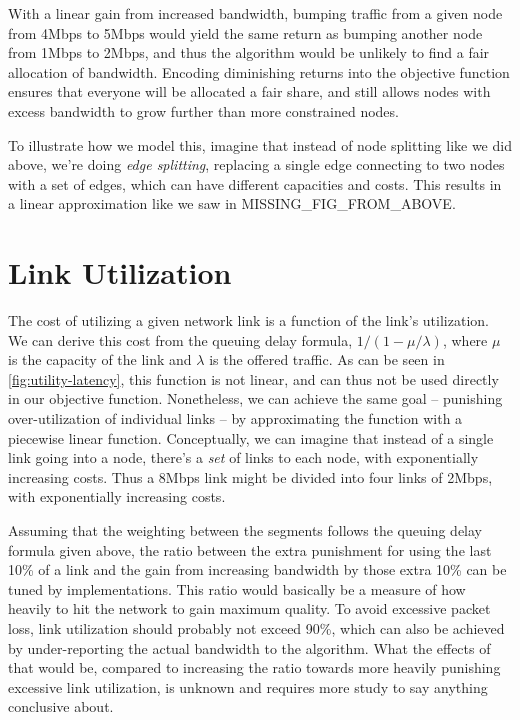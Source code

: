 With a linear gain from increased bandwidth, bumping traffic from a given node from 4Mbps to 5Mbps would yield the same return as bumping another node from 1Mbps to 2Mbps, and thus the algorithm would be unlikely to find a fair allocation of bandwidth. Encoding diminishing returns into the objective function ensures that everyone will be allocated a fair share, and still allows nodes with excess bandwidth to grow further than more constrained nodes.

To illustrate how we model this, imagine that instead of node splitting like we did above, we're doing \emph{edge splitting}, replacing a single edge connecting to two nodes with a set of edges, which can have different capacities and costs. This results in a linear approximation like we saw in MISSING\_FIG\_FROM\_ABOVE.


\section{Link Utilization}

The cost of utilizing a given network link is a function of the link's utilization. We can derive this cost from the queuing delay formula, $1/(1 - \mu/\lambda)$, where $\mu$ is the capacity of the link and $\lambda$ is the offered traffic. As can be seen in \autoref{fig:utility-latency}, this function is not linear, and can thus not be used directly in our objective function. Nonetheless, we can achieve the same goal -- punishing over-utilization of individual links -- by approximating the function with a piecewise linear function. Conceptually, we can imagine that instead of a single link going into a node, there's a \emph{set} of links to each node, with exponentially increasing costs. Thus a 8Mbps link might be divided into four links of 2Mbps, with exponentially increasing costs.

Assuming that the weighting between the segments follows the queuing delay formula given above, the ratio between the extra punishment for using the last 10\% of a link and the gain from increasing bandwidth by those extra 10\% can be tuned by implementations. This ratio would basically be a measure of how heavily to hit the network to gain maximum quality. To avoid excessive packet loss, link utilization should probably not exceed 90\%, which can also be achieved by under-reporting the actual bandwidth to the algorithm. What the effects of that would be, compared to increasing the ratio towards more heavily punishing excessive link utilization, is unknown and requires more study to say anything conclusive about.

